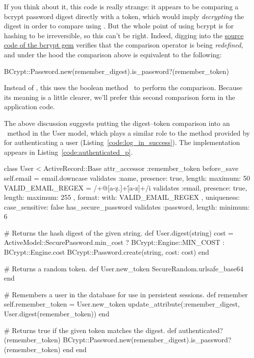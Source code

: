 \noindent If you think about it, this code is really strange: it appears to be comparing a bcrypt password digest directly with a token, which would imply \emph{decrypting} the digest in order to compare using \kode{==}. But the whole point of using bcrypt is for hashing to be irreversible, so this can't be right. Indeed, digging into the \href{https://github.com/codahale/bcrypt-ruby/blob/master/lib/bcrypt/password.rb}{source code of the bcrypt gem} verifies that the comparison operator \kode{==} is being \emph{redefined}, and under the hood the comparison above is equivalent to the following:

\begin{code}
BCrypt::Password.new(remember_digest).is_password?(remember_token)
\end{code}

\noindent Instead of \kode{==}, this uses the boolean method \ to perform the comparison. Because its meaning is a little clearer, we'll prefer this second comparison form in the application code.

The above discussion suggests putting the digest--token comparison into an \ method in the User model, which plays a similar role to the  method provided by  for authenticating a user (Listing~\ref{code:log_in_success}). The implementation appears in Listing~\ref{code:authenticated_p}.

\begin{codelisting}
\label{code:authenticated_p}
\begin{code}
class User < ActiveRecord::Base
  attr_accessor :remember_token
  before_save { self.email = email.downcase }
  validates :name,  presence: true, length: { maximum: 50 }
  VALID_EMAIL_REGEX = /\A[\w+\-.]+@[a-z\d\-.]+\.[a-z]+\z/i
  validates :email, presence: true, length: { maximum: 255 },
                    format: { with: VALID_EMAIL_REGEX },
                    uniqueness: { case_sensitive: false }
  has_secure_password
  validates :password, length: { minimum: 6 }

  # Returns the hash digest of the given string.
  def User.digest(string)
    cost = ActiveModel::SecurePassword.min_cost ? BCrypt::Engine::MIN_COST :
                                                  BCrypt::Engine.cost
    BCrypt::Password.create(string, cost: cost)
  end

  # Returns a random token.
  def User.new_token
    SecureRandom.urlsafe_base64
  end

  # Remembers a user in the database for use in persistent sessions.
  def remember
    self.remember_token = User.new_token
    update_attribute(:remember_digest, User.digest(remember_token))
  end

  # Returns true if the given token matches the digest.
  def authenticated?(remember_token)
    BCrypt::Password.new(remember_digest).is_password?(remember_token)
  end
end
\end{code}
\end{codelisting}

